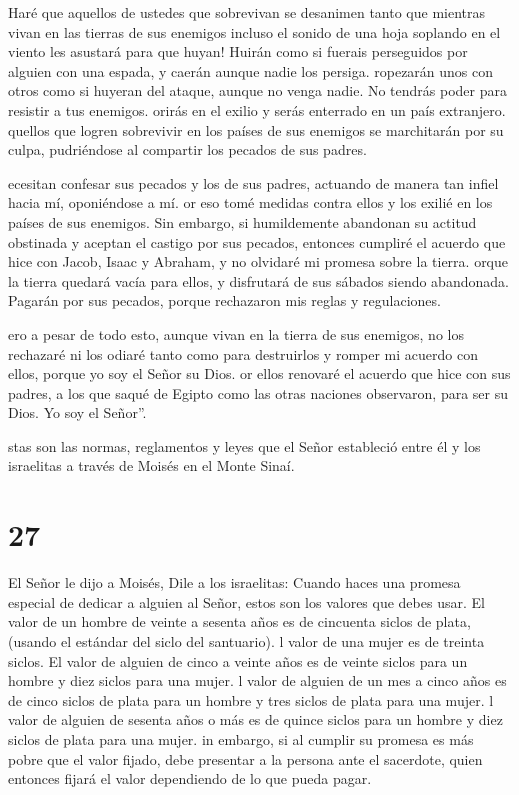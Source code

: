  Haré que aquellos de ustedes que sobrevivan se desanimen
tanto que mientras vivan en las tierras de sus enemigos incluso el
sonido de una hoja soplando en el viento les asustará para que huyan!
Huirán como si fuerais perseguidos por alguien con una espada, y caerán
aunque nadie los persiga.  ropezarán unos con otros como si
huyeran del ataque, aunque no venga nadie. No tendrás poder para
resistir a tus enemigos.  orirás en el exilio y serás
enterrado en un país extranjero.  quellos que logren
sobrevivir en los países de sus enemigos se marchitarán por su culpa,
pudriéndose al compartir los pecados de sus padres.

 ecesitan confesar sus pecados y los de sus padres,
actuando de manera tan infiel hacia mí, oponiéndose a mí. 
or eso tomé medidas contra ellos y los exilié en los países de sus
enemigos. Sin embargo, si humildemente abandonan su actitud obstinada y
aceptan el castigo por sus pecados,  entonces cumpliré el
acuerdo que hice con Jacob, Isaac y Abraham, y no olvidaré mi promesa
sobre la tierra.  orque la tierra quedará vacía para ellos,
y disfrutará de sus sábados siendo abandonada. Pagarán por sus pecados,
porque rechazaron mis reglas y regulaciones.

 ero a pesar de todo esto, aunque vivan en la tierra de sus
enemigos, no los rechazaré ni los odiaré tanto como para destruirlos y
romper mi acuerdo con ellos, porque yo soy el Señor su Dios.
 or ellos renovaré el acuerdo que hice con sus padres, a
los que saqué de Egipto como las otras naciones observaron, para ser su
Dios. Yo soy el Señor''.

 stas son las normas, reglamentos y leyes que el Señor
estableció entre él y los israelitas a través de Moisés en el Monte
Sinaí.

\hypertarget{section-26}{%
\section{27}\label{section-26}}

 El Señor le dijo a Moisés,  Dile a los
israelitas: Cuando haces una promesa especial de dedicar a alguien al
Señor, estos son los valores que debes usar.  El valor de un
hombre de veinte a sesenta años es de cincuenta siclos de plata, (usando
el estándar del siclo del santuario).  l valor de una mujer
es de treinta siclos.  El valor de alguien de cinco a veinte
años es de veinte siclos para un hombre y diez siclos para una mujer.
 l valor de alguien de un mes a cinco años es de cinco
siclos de plata para un hombre y tres siclos de plata para una mujer.
 l valor de alguien de sesenta años o más es de quince
siclos para un hombre y diez siclos de plata para una mujer.
 in embargo, si al cumplir su promesa es más pobre que el
valor fijado, debe presentar a la persona ante el sacerdote, quien
entonces fijará el valor dependiendo de lo que pueda pagar.


